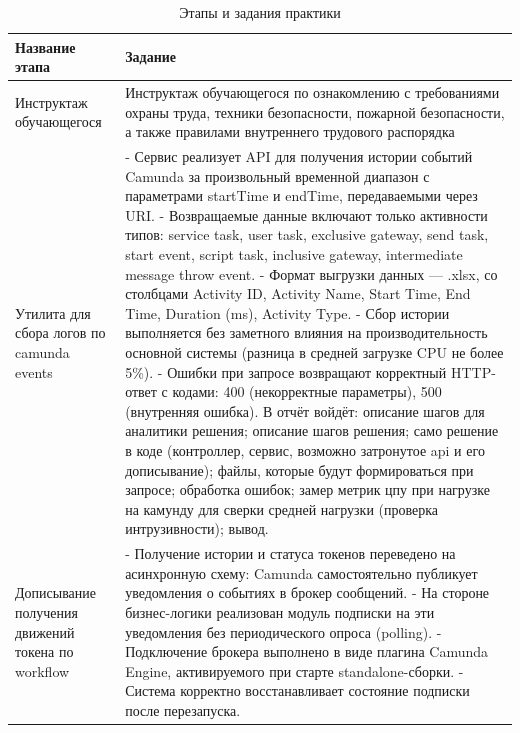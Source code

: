 \begin{table}[h]
  \centering
  \caption{Этапы и задания практики}
  \label{tab:practice-stages}
  \renewcommand{\arraystretch}{1.2}
  \begin{tabularx}{\textwidth}{|>{\raggedright\arraybackslash}p{}|>{\raggedright\arraybackslash}X|}
    \hline
    \textbf{Название этапа} & \textbf{Задание} \\
    \hline
    Инструктаж обучающегося & Инструктаж обучающегося по ознакомлению с требованиями охраны труда, техники безопасности, пожарной безопасности, а также правилами внутреннего трудового распорядка \\
    \hline
    Утилита для сбора логов по camunda events & - Сервис реализует API для получения истории событий Camunda за произвольный временной диапазон с параметрами startTime и endTime, передаваемыми через URI. - Возвращаемые данные включают только активности типов: service task, user task, exclusive gateway, send task, start event, script task, inclusive gateway, intermediate message throw event. - Формат выгрузки данных — .xlsx, со столбцами Activity ID, Activity Name, Start Time, End Time, Duration (ms), Activity Type. - Сбор истории выполняется без заметного влияния на производительность основной системы (разница в средней загрузке CPU не более 5\%). - Ошибки при запросе возвращают корректный HTTP-ответ с кодами: 400 (некорректные параметры), 500 (внутренняя ошибка). В отчёт войдёт: описание шагов для аналитики решения; описание шагов решения; само решение в коде (контроллер, сервис, возможно затронутое api и его дописывание); файлы, которые будут формироваться при запросе; обработка ошибок; замер метрик цпу при нагрузке на камунду для сверки средней нагрузки (проверка интрузивности); вывод. \\
    \hline
    Дописывание получения движений токена по workflow & - Получение истории и статуса токенов переведено на асинхронную схему: Camunda самостоятельно публикует уведомления о событиях в брокер сообщений. - На стороне бизнес-логики реализован модуль подписки на эти уведомления без периодического опроса (polling). - Подключение брокера выполнено в виде плагина Camunda Engine, активируемого при старте standalone-сборки. - Система корректно восстанавливает состояние подписки после перезапуска. \\
    \hline
  \end{tabularx}
\end{table}

